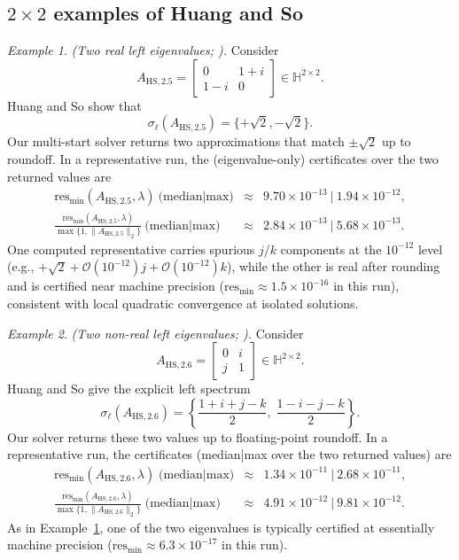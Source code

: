 \documentclass[preprint,12pt]{elsarticle}  %
\theoremstyle{definition}
\theoremstyle{definition}
\theoremstyle{definition}
\theoremstyle{definition}
\theoremstyle{definition}
\theoremstyle{remark}
\theoremstyle{remark}
\newtheorem{Ex}{Example}
\theoremstyle{remark}
\DeclareRobustCommand{\i}{\ensuremath{\mathbf{i}}}
\DeclareRobustCommand{\j}{\ensuremath{\mathbf{j}}}
\DeclareRobustCommand{\k}{\ensuremath{\mathbf{k}}}
\def\i{i}\def\j{j}\def\k{k}%
\newcommand{\HH}{\mathbb{H}}
\begin{document}
\subsection{\texorpdfstring{$2\times2$}{2x2} examples of Huang and So}
\label{subsec:examples_huangso}
\begin{Ex}\label{ex:HS_25}
\emph{(Two real left eigenvalues; \cite[Ex.~2.5]{HuangSo2001}).}
Consider
\[
A_{\mathrm{HS},2.5}=
\begin{bmatrix}
0 & 1+\i\\
1-\i & 0
\end{bmatrix}\in\HH^{2\times2}.
\]
Huang and So show that
\[
\sigma_\ell(A_{\mathrm{HS},2.5})=\{+\sqrt{2},-\sqrt{2}\}.
\]
Our multi-start solver returns two approximations that match $\pm\sqrt2$ up to roundoff.
In a representative run, the (eigenvalue-only) certificates over the two returned values are
\[
\begin{array}{rcl}
\mathrm{res}_{\min}(A_{\mathrm{HS},2.5},\lambda)\ \text{(median|max)}
&\approx& 9.70\times10^{-13}\ \big|\ 1.94\times10^{-12},\\[2mm]
\frac{\mathrm{res}_{\min}(A_{\mathrm{HS},2.5},\lambda)}{\max\{1,\|A_{\mathrm{HS},2.5}\|_2\}}\ \text{(median|max)}
&\approx& 2.84\times10^{-13}\ \big|\ 5.68\times10^{-13}.
\end{array}
\]
One computed representative carries spurious $\j$/$\k$ components at the $10^{-12}$ level
(e.g., $+\sqrt2+\mathcal{O}(10^{-12})\j+\mathcal{O}(10^{-12})\k$), while the other is real after rounding and is certified
near machine precision ($\mathrm{res}_{\min}\approx 1.5\times10^{-16}$ in this run), consistent with local quadratic
convergence at isolated solutions.
\end{Ex}

\begin{Ex}\label{ex:HS_26}
\emph{(Two non-real left eigenvalues; \cite[Ex.~2.6]{HuangSo2001}).}
Consider
\[
A_{\mathrm{HS},2.6}=
\begin{bmatrix}
0 & \i\\
\j & 1
\end{bmatrix}\in\HH^{2\times2}.
\]
Huang and So give the explicit left spectrum
\[
\sigma_\ell(A_{\mathrm{HS},2.6})
=\left\{
\frac{1+\i+\j-\k}{2},\;
\frac{1-\i-\j-\k}{2}
\right\}.
\]
Our solver returns these two values up to floating-point roundoff.
In a representative run, the certificates (median|max over the two returned values) are
\[
\begin{array}{rcl}
\mathrm{res}_{\min}(A_{\mathrm{HS},2.6},\lambda)\;
\text{(median|max)}
&\approx &1.34\times10^{-11}\ \big|\ 2.68\times10^{-11},
\\[2mm]
\frac{\mathrm{res}_{\min}(A_{\mathrm{HS},2.6},\lambda)}{\max\{1,\|A_{\mathrm{HS},2.6}\|_2\}}\;
\text{(median|max)}
&\approx& 4.91\times10^{-12}\ \big|\ 9.81\times10^{-12}.
\end{array}
\]
As in Example~\ref{ex:HS_25}, one of the two eigenvalues is typically certified at essentially machine precision
($\mathrm{res}_{\min}\approx 6.3\times10^{-17}$ in this run).
\end{Ex}
\end{document}
